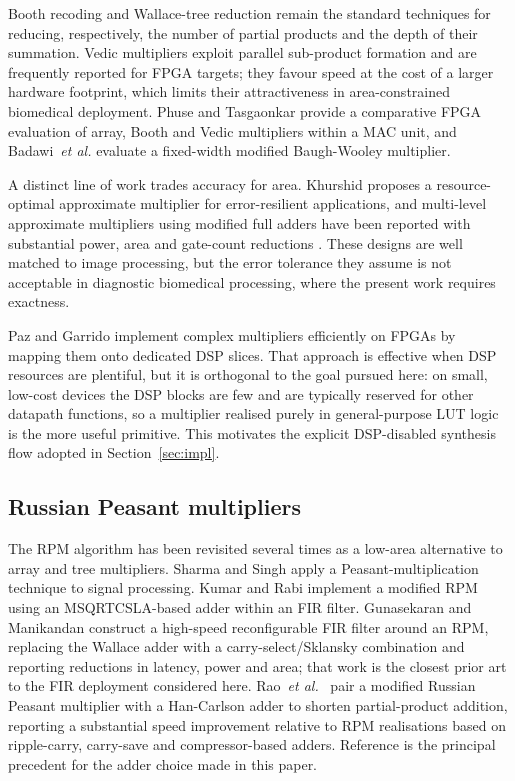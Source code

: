 \documentclass[conference]{IEEEtran}
\begin{document}
Booth recoding \cite{prabhu} and Wallace-tree reduction \cite{abed}
remain the standard techniques for reducing, respectively, the number
of partial products and the depth of their summation. Vedic multipliers
\cite{bansal,gokhale} exploit parallel sub-product formation and
are frequently reported for FPGA targets; they favour speed at the cost
of a larger hardware footprint, which limits their attractiveness in
area-constrained biomedical deployment. Phuse and Tasgaonkar
\cite{phuse} provide a comparative FPGA evaluation of array, Booth and
Vedic multipliers within a MAC unit, and Badawi~\textit{et al.}
\cite{badawi} evaluate a fixed-width modified Baugh-Wooley multiplier.

A distinct line of work trades accuracy for area. Khurshid
\cite{khurshid} proposes a resource-optimal approximate multiplier for
error-resilient applications, and multi-level approximate multipliers
using modified full adders have been reported with substantial power,
area and gate-count reductions \cite{approx2025}. These designs are
well matched to image processing, but the error tolerance they assume
is not acceptable in diagnostic biomedical processing, where the
present work requires exactness.

Paz and Garrido \cite{paz} implement complex multipliers efficiently on
FPGAs by mapping them onto dedicated DSP slices. That approach is
effective when DSP resources are plentiful, but it is orthogonal to the
goal pursued here: on small, low-cost devices the DSP blocks are few
and are typically reserved for other datapath functions, so a
multiplier realised purely in general-purpose LUT logic is the more
useful primitive. This motivates the explicit DSP-disabled synthesis
flow adopted in Section~\ref{sec:impl}.

\subsection{Russian Peasant multipliers}

The RPM algorithm has been revisited several times as a low-area
alternative to array and tree multipliers. Sharma and Singh
\cite{sharma} apply a Peasant-multiplication technique to signal
processing. Kumar and Rabi \cite{kumar} implement a modified RPM using
an MSQRTCSLA-based adder within an FIR filter. Gunasekaran and
Manikandan \cite{gunasekaran} construct a high-speed reconfigurable FIR
filter around an RPM, replacing the Wallace adder with a
carry-select/Sklansky combination and reporting reductions in latency,
power and area; that work is the closest prior art to the FIR
deployment considered here. Rao~\textit{et al.}~\cite{rao} pair a
modified Russian Peasant multiplier with a Han-Carlson adder to shorten
partial-product addition, reporting a substantial speed improvement
relative to RPM realisations based on ripple-carry, carry-save and
compressor-based adders. Reference \cite{rao} is the principal
precedent for the adder choice made in this paper.
\end{document}
